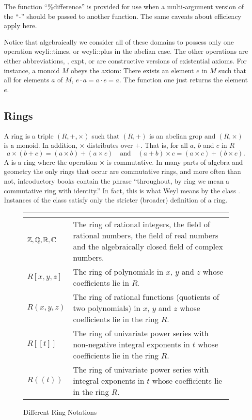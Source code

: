 The function ``{\sf \%difference}'' is provided for use when a
multi-argument version of the ``{\sf -}'' should be passed to another
function.  The same caveats about efficiency apply here.

Notice that algebraically we consider all of these domains to possess
only one operation {\sf weyli::times}, or {\sf weyli::plus} in the
abelian case.  The other operations are either abbreviations, \eg,
{\sf expt}, or are constructive versions of existential axioms.  For
instance, a monoid $M$ obeys the axiom: There exists an element $e$ in
$M$ such that all for elements $a$ of $M$, $e\cdot a = a\cdot e = a$.
The function {\sf one} just returns the element $e$.


\subsection{Rings}
A ring is a triple $(R, +, \times)$ such that $(R, +)$
is an abelian grop and $(R, \times)$ is a monoid.  In addition,
$\times$ distributes over $+$.  That is, for all $a$, $b$ and $c$ in
$R$
\[
a\times (b + c) = (a\times b) + (a \times c)
\quad\mbox{and}\quad
(a + b) \times c = (a \times c) + (b \times c).
\]
A  is a ring where the operation $\times$ is
commutative.  In many parts of algebra and geometry the only rings
that occur are commutative rings, and more often than not,
introductory books contain the phrase ``throughout, by ring we mean a
commutative ring with identity.''  In fact, this is what Weyl means by
the class .  Instances of the class 
satisfy only the stricter (broader) definition of a ring.

\begin{figure}
\begin{center}
\begin{tabular}{|l|p{4in}|} \multicolumn{2}{c}{}\\ \hline 
${\Bbb Z}, {\Bbb Q}, {\Bbb R}, {\Bbb C}$ & The ring of rational integers, the field of rational
numbers, the field of real numbers and the algebraically closed field
of complex numbers. \\ \hline
$R[x, y, z]$ & The ring of polynomials in $x$, $y$ and $z$ whose
coefficients lie in $R$. \\ \hline
$R(x, y, z)$ & The ring of rational functions (quotients of two
polynomials) in $x$, $y$ and $z$ whose coefficients lie in the ring
$R$. \\ \hline
$R[[t]]$ & The ring of univariate power series with non-negative
integral exponents in $t$ whose coefficients lie in the ring $R$. \\
\hline 
$R((t))$ & The ring of univariate power series with integral exponents
in $t$ whose coefficients lie in the ring $R$. \\  \hline 
\end{tabular}
\end{center}
\caption{Different Ring Notations\label{RingNotation:Fig}}
\end{figure}

